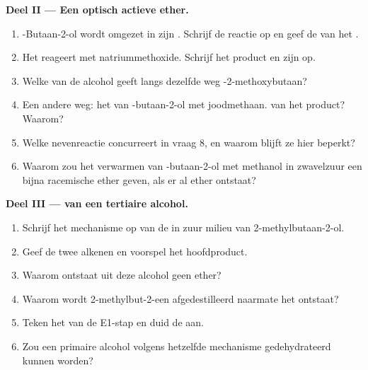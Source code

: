 \begin{problem}
\medskip
\noindent\textbf{Deel II --- Een optisch actieve ether.}
\begin{enumerate}[resume]
  \item {}-Butaan-2-ol wordt omgezet in zijn . Schrijf de
        reactie op en geef de  van het .
  \item Het  reageert met natriummethoxide. Schrijf het product
        en zijn  op.
  \item Welke  van de alcohol geeft langs dezelfde weg
        -2-methoxybutaan?
  \item Een andere weg: het  van -butaan-2-ol met
        joodmethaan.  van het product? Waarom?
  \item Welke nevenreactie concurreert in vraag 8, en waarom blijft ze
        hier beperkt?
  \item Waarom zou het verwarmen van -butaan-2-ol met methanol in
        zwavelzuur een bijna racemische ether geven, als er al ether
        ontstaat?
\end{enumerate}

\medskip
\noindent\textbf{Deel III ---  van een tertiaire alcohol.}
\begin{enumerate}[resume]
  \item Schrijf het mechanisme op van de  in zuur milieu van
        2-methylbutaan-2-ol.
  \item Geef de twee alkenen en voorspel het hoofdproduct.
  \item Waarom ontstaat uit deze alcohol geen ether?
  \item Waarom wordt 2-methylbut-2-een afgedestilleerd naarmate het
        ontstaat?
  \item Teken het  van de E1-stap en duid de
         aan.
  \item Zou een primaire alcohol volgens hetzelfde mechanisme
        gedehydrateerd kunnen worden?
\end{enumerate}


\end{problem}
